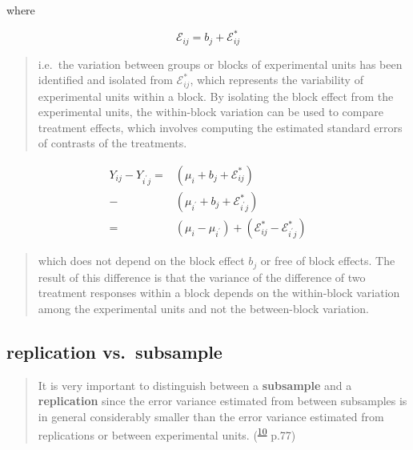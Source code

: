 \documentclass[
]{book}
\theoremstyle{definition}
\theoremstyle{definition}
\theoremstyle{definition}
\theoremstyle{definition}
\theoremstyle{remark}
\begin{document}
where

\[
\mathcal{E}_{{\scriptscriptstyle i}{\scriptscriptstyle j}}=b_{{\scriptscriptstyle j}}+\mathcal{E}_{{\scriptscriptstyle i}{\scriptscriptstyle j}}^{*}
\]

\begin{quote}
i.e.~the variation between groups or blocks of experimental units has been identified and isolated from \(\mathcal{E}_{ij}^{*}\), which represents the variability of experimental units within a block. By isolating the block effect from the experimental units, the within-block variation can be used to compare treatment effects, which involves computing the estimated standard errors of contrasts of the treatments.
\end{quote}

\[
\begin{aligned}
Y_{{\scriptscriptstyle i}{\scriptscriptstyle j}}-Y_{{\scriptscriptstyle i^{\prime}}{\scriptscriptstyle j}}= & \left(\mu_{{\scriptscriptstyle i}}+b_{{\scriptscriptstyle j}}+\mathcal{E}_{{\scriptscriptstyle i}{\scriptscriptstyle j}}^{*}\right)\\
- & \left(\mu_{{\scriptscriptstyle i^{\prime}}}+b_{{\scriptscriptstyle j}}+\mathcal{E}_{{\scriptscriptstyle i^{\prime}}{\scriptscriptstyle j}}^{*}\right)\\
= & \left(\mu_{{\scriptscriptstyle i}}-\mu_{{\scriptscriptstyle i^{\prime}}}\right)+\left(\mathcal{E}_{{\scriptscriptstyle i}{\scriptscriptstyle j}}^{*}-\mathcal{E}_{{\scriptscriptstyle i^{\prime}}{\scriptscriptstyle j}}^{*}\right)
\end{aligned}
\]

\begin{quote}
which does not depend on the block effect \(b_{j}\) or free of block effects. The result of this difference is that the variance of the difference of two treatment responses within a block depends on the within-block variation among the experimental units and not the between-block variation.
\end{quote}

\hypertarget{replication-vs.-subsample}{%
\subsection{replication vs.~subsample}\label{replication-vs.-subsample}}

\begin{quote}
It is very important to distinguish between a \textbf{subsample} and a \textbf{replication} since the error variance estimated from between subsamples is in general considerably smaller than the error variance estimated from replications or between experimental units. (\textsuperscript{\protect\hyperlink{ref-milliken2004}{10}} p.77)
\end{quote}
\end{document}
